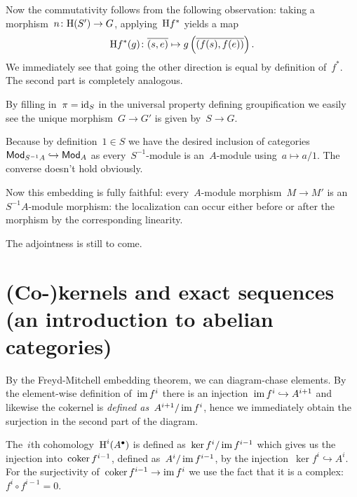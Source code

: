 \begin{exercise}
  Now the commutativity follows from the following observation: taking a morphism~$n\colon\mathrm{H}(S')\to G$, applying~$\mathrm{H} f^*$ yields a map
  \begin{equation}
    \mathrm{H} f^*(g)\colon\overline{(s,e)}\mapsto g\left( \overline{\left( f(s),f(e) \right)} \right). 
  \end{equation}
  We immediately see that going the other direction is equal by definition of~$f^*$. The second part is completely analogous.
\end{exercise}

\begin{exercise}
  By filling in~$\pi=\mathrm{id}_S$ in the universal property defining groupification we easily see the unique morphism~$G\to G'$ is given by~$S\to G$.
\end{exercise}

\begin{exercise}
  \label{exercise:25g}
  Because by definition~$1\in S$ we have the desired inclusion of categories~$\mathsf{Mod}_{S^{-1}A}\hookrightarrow\mathsf{Mod}_A$ as every~$S^{-1}$\nobreakdash-module is an~$A$\nobreakdash-module using~$a\mapsto a/1$. The converse doesn't hold obviously.

  Now this embedding is fully faithful: every~$A$\nobreakdash-module morphism~$M\to M'$ is an~$S^{-1}A$\nobreakdash-module morphism: the localization can occur either before or after the morphism by the corresponding linearity.

  The adjointness is still to come.
\end{exercise}


\section{(Co-)kernels and exact sequences (an introduction to abelian categories)}

\begin{exercise}
  By the Freyd-Mitchell embedding theorem, we can diagram-chase elements. By the element-wise definition of~$\operatorname{im} f^i$ there is an injection~$\operatorname{im} f^i\hookrightarrow A^{i+1}$ and likewise the cokernel is \emph{defined as}~$A^{i+1}/\operatorname{im} f^i$, hence we immediately obtain the surjection in the second part of the diagram.

  The~$i$th cohomology~$\operatorname{H}^i(A^\bullet)$ is defined as~$\ker f^i/\operatorname{im} f^{i-1}$ which gives us the injection into~$\operatorname{coker} f^{i-1}$, defined as~$A^i/\operatorname{im} f^{i-1}$, by the injection~$\ker f^{i}\hookrightarrow A^i$. For the surjectivity of~$\operatorname{coker} f^{i-1}\to\operatorname{im} f^i$ we use the fact that it is a complex:~$f^i\circ f^{i-1}=0$.
\end{exercise}

